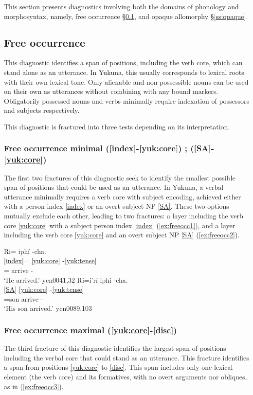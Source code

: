 \documentclass[output=paper]{langscibook}
\begin{document}
This section presents diagnostics involving both the domains of phonology and morphosyntax, namely, free occurrence §\ref{ss:freeocc}, and opaque allomorphy §\ref{ss:opaque}. 

\subsection{Free occurrence}
\label{ss:freeocc}

This diagnostic identifies a span of positions, including the verb core, which can stand alone as an utterance. In Yukuna, this usually corresponds to lexical roots with their own lexical tone. Only alienable and non-possessible nouns can be used on their own as utterances without combining with any bound markers. Obligatorily possessed nouns and verbs minimally require indexation of possessors and subjects respectively. 

This diagnostic is fractured into three tests depending on its interpretation. 

\subsubsection{Free occurrence minimal (\ref{index}-\ref{yuk:core}) ; (\ref{SA}-\ref{yuk:core})}
The first two fractures of this diagnostic seek to identify the smallest possible span of positions that could be used as an utterance. In Yukuna, a verbal utterance minimally requires a verb core with subject encoding, achieved either with a person index \ref{index} or an overt subject NP \ref{SA}. These two options mutually exclude each other, leading to two fractures: a layer including the verb core \ref{yuk:core} with a subject person index \ref{index} (\ref{ex:freeocc1}), and a layer including the verb core \ref{yuk:core} and an overt subject NP \ref{SA} (\ref{ex:freeocc2}). 

\ea 
\ea \label{ex:freeocc1}
\glll Ri= iphí -cha.\\
	  \ref{index}= \ref{yuk:core} -\ref{yuk:tense} \\
       	\Tsg{}= arrive -\Pst{} \\
    \glt `He arrived.' \hfill ycn0041,32
    \ex \label{ex:freeocc2}
	\glll Ri=i'rí iphí -cha.	\\
	       \ref{SA} \ref{yuk:core} -\ref{yuk:tense} \\
	    \Tsg{}=son arrive -\Pst{}\\
		\glt `His son arrived.' \hfill ycn0089,103
	\z
	\z 

\subsubsection{Free occurrence maximal (\ref{yuk:core}-\ref{disc})}
The third fracture of this diagnostic identifies the largest span of positions including the verbal core that could stand as an utterance. This fracture identifies a span from positions \ref{yuk:core} to \ref{disc}. This span includes only one lexical element (the verb core) and its formatives, with no overt arguments nor obliques, as in (\ref{ex:freeocc3}).
\end{document}
